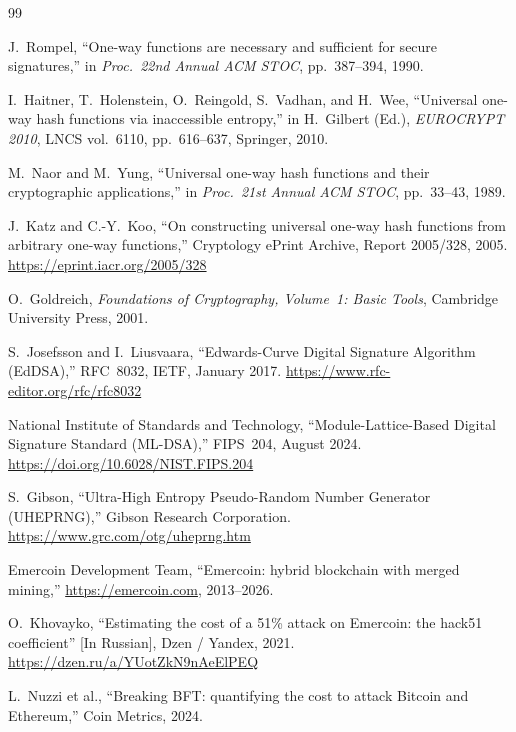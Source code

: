 \documentclass[11pt,a4paper]{article}
\begin{document}
\begin{thebibliography}{99}

  J.~Rompel,
  ``One-way functions are necessary and sufficient for secure signatures,''
  in \textit{Proc.\ 22nd Annual ACM STOC}, pp.~387--394, 1990.

  I.~Haitner, T.~Holenstein, O.~Reingold, S.~Vadhan, and H.~Wee,
  ``Universal one-way hash functions via inaccessible entropy,''
  in H.~Gilbert (Ed.), \textit{EUROCRYPT 2010},
  LNCS vol.~6110, pp.~616--637, Springer, 2010.

  M.~Naor and M.~Yung,
  ``Universal one-way hash functions and their cryptographic applications,''
  in \textit{Proc.\ 21st Annual ACM STOC}, pp.~33--43, 1989.

  J.~Katz and C.-Y.~Koo,
  ``On constructing universal one-way hash functions from arbitrary one-way
  functions,''
  Cryptology ePrint Archive, Report 2005/328, 2005.
  \url{https://eprint.iacr.org/2005/328}

  O.~Goldreich,
  \textit{Foundations of Cryptography, Volume~1: Basic Tools},
  Cambridge University Press, 2001.

  S.~Josefsson and I.~Liusvaara,
  ``Edwards-Curve Digital Signature Algorithm (EdDSA),''
  RFC~8032, IETF, January 2017.
  \url{https://www.rfc-editor.org/rfc/rfc8032}

  National Institute of Standards and Technology,
  ``Module-Lattice-Based Digital Signature Standard (ML-DSA),''
  FIPS~204, August 2024.
  \url{https://doi.org/10.6028/NIST.FIPS.204}

  S.~Gibson,
  ``Ultra-High Entropy Pseudo-Random Number Generator (UHEPRNG),''
  Gibson Research Corporation.
  \url{https://www.grc.com/otg/uheprng.htm}

  Emercoin Development Team,
  ``Emercoin: hybrid blockchain with merged mining,''
  \url{https://emercoin.com}, 2013--2026.

  O.~Khovayko,
  ``Estimating the cost of a 51\% attack on Emercoin: the hack51 coefficient''
  [In Russian],
  Dzen / Yandex, 2021.
  \url{https://dzen.ru/a/YUotZkN9nAeElPEQ}

  L.~Nuzzi et al.,
  ``Breaking BFT: quantifying the cost to attack Bitcoin and Ethereum,''
  Coin Metrics, 2024.


\end{thebibliography}
\end{document}
